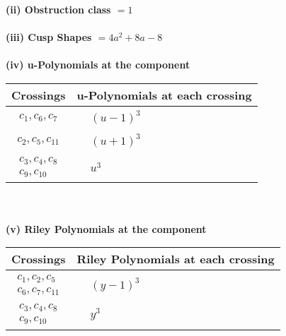 \documentclass[1p]{elsarticle_modified}
\theoremstyle{definition}
\begin{document}
\flushleft \textbf{(ii) Obstruction class $= 1$}\\~\\
\flushleft \textbf{(iii) Cusp Shapes $= 4 a^2+8 a-8$}\\~\\
\newpage\renewcommand{\arraystretch}{1}
\flushleft \textbf{(iv) u-Polynomials at the component}\newline \\
\begin{tabular}{m{50pt}|m{274pt}}
Crossings & \hspace{64pt}u-Polynomials at each crossing \\
\hline $$\begin{aligned}c_{1},c_{6},c_{7}\end{aligned}$$&$\begin{aligned}
&(u-1)^3
\end{aligned}$\\
\hline $$\begin{aligned}c_{2},c_{5},c_{11}\end{aligned}$$&$\begin{aligned}
&(u+1)^3
\end{aligned}$\\
\hline $$\begin{aligned}c_{3},c_{4},c_{8}\\c_{9},c_{10}\end{aligned}$$&$\begin{aligned}
&u^3
\end{aligned}$\\
\hline
\end{tabular}\\~\\
\newpage\renewcommand{\arraystretch}{1}
\flushleft \textbf{(v) Riley Polynomials at the component}\newline \\
\begin{tabular}{m{50pt}|m{274pt}}
Crossings & \hspace{64pt}Riley Polynomials at each crossing \\
\hline $$\begin{aligned}c_{1},c_{2},c_{5}\\c_{6},c_{7},c_{11}\end{aligned}$$&$\begin{aligned}
&(y-1)^3
\end{aligned}$\\
\hline $$\begin{aligned}c_{3},c_{4},c_{8}\\c_{9},c_{10}\end{aligned}$$&$\begin{aligned}
&y^3
\end{aligned}$\\
\hline
\end{tabular}\\~\\
\end{document}

